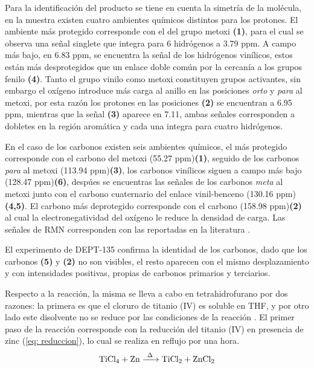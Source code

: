 \documentclass[fleqn,11pt]{SelfArx}
\begin{document}
Para la identificaci\'on del producto se tiene en cuenta la simetr\'ia de la mol\'ecula, en la muestra existen cuatro ambientes químicos distintos para los protones. El ambiente m\'as protegido corresponde con el del grupo metoxi \textbf{(1)}, para el cual se observa una señal singlete que integra para 6 hidr\'ogenos a 3.79 ppm. A campo m\'as bajo, en 6.83 ppm, se encuentra la señal de los hidr\'ogenos vin\'ilicos, estos est\'an m\'as desprotegidos que un enlace doble com\'un por la cercan\'ia a los grupos fenilo \textbf{(4)}. Tanto el grupo vinilo como metoxi constituyen grupos activantes, sin embargo el ox\'igeno introduce m\'as carga al anillo en las posiciones \textit{orto} y \textit{para} al metoxi, por esta raz\'on los protones en las posiciones \textbf{(2)} se encuentran a 6.95 ppm, mientras que la señal \textbf{(3)} aparece en 7.11, ambas señales corresponden a dobletes en la regi\'on arom\'atica y cada una integra para cuatro hidr\'ogenos. 

En el caso de los carbonos existen seis ambientes qu\'imicos, el m\'as protegido corresponde con el carbono del metoxi (55.27 ppm)\textbf{(1)}, seguido de los carbonos \textit{para} al metoxi (113.94 ppm)\textbf{(3)}, los carbonos vin\'ilicos siguen a campo m\'as bajo (128.47 ppm)\textbf{(6)}, desp\'ues se encuentras las señales de los carbonos \textit{meta} al metoxi junto con el carbono cuaternario del enlace vinil-benceno (130.16 ppm)\textbf{(4,5)}. El carbono m\'as deprotegido corresponde con el carbono (158.98 ppm)\textbf{(2)} al cual la electronegatividad del ox\'igeno le reduce la densidad de carga. Las señales de RMN corresponden con las reportadas en la literatura \cite{Zhong2016}. 

El experimento de DEPT-135 confirma la identidad de los carbonos, dado que los carbonos \textbf{(5)} y \textbf{(2)} no son visibles, el resto aparecen con el mismo desplazamiento y con intensidades positivas, propias de carbonos primarios y terciarios.

Respecto a la reacci\'on, la misma se lleva a cabo en tetrahidrofurano por dos razones: la primera es que el cloruro de titanio (IV) es soluble en THF, y por otro lado este disolvente no se reduce por las condiciones de la reacci\'on \cite{richards2001}. El primer paso de la reacci\'on corresponde con la reducci\'on del titanio (IV) en presencia de zinc (\autoref{eq: reduccion}), lo cual se realiza en reflujo por una hora.
\begin{equation}\label{eq: reduccion}
	\ce{TiCl4 + Zn ->[\Delta] TiCl2 + ZnCl2}
\end{equation}
\end{document}
